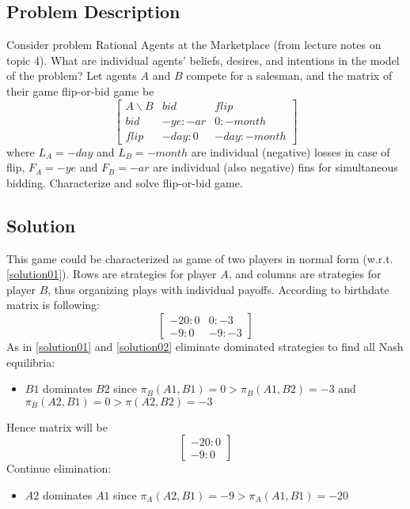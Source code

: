 \documentclass[
	a4paper, %
	11pt, %
]{CSUniSchoolLabReport}
\begin{document}
\subsection{Problem Description}\label{writeup03}
Consider problem Rational Agents at the Marketplace (from lecture notes on topic 4). What are individual agents’ beliefs, desires, and intentions in the model of the problem? Let agents $A$ and $B$ compete for a salesman, and the matrix of their game flip-or-bid game be
$$
\begin{bmatrix}
    A\backslash B & bid & flip \\
    bid & -ye:-ar & 0:-month \\
    flip & -day:0 & -day:-month
\end{bmatrix}
$$
where $L_A = -day$ and $L_B = -month$ are individual (negative) losses in case of flip, $F_A = -ye$ and $F_B = -ar$ are individual (also negative) fins for simultaneous bidding. Characterize and solve flip-or-bid game.

\subsection{Solution}\label{solution03}
This game could be characterized as game of two players in normal form (w.r.t. \ref{solution01}). Rows are strategies for player $A$, and columns are strategies for player $B$, thus organizing plays with individual payoffs. According to birthdate matrix is following:
$$
\begin{bmatrix}
    -20:0 & 0:-3 \\
    -9:0 & -9:-3
\end{bmatrix}
$$
As in \ref{solution01} and \ref{solution02} eliminate dominated strategies to find all Nash equilibria:
\begin{itemize}
    \item $B1$ dominates $B2$ since $\pi_B(A1, B1) = 0 > \pi_B(A1, B2) = -3$ and $\pi_B(A2, B1) = 0 > \pi(A2, B2) = -3$
\end{itemize}\hspace{2pt}

Hence matrix will be
$$
\begin{bmatrix}
    -20:0 \\
    -9:0
\end{bmatrix}
$$
Continue elimination:
\begin{itemize}
    \item $A2$ dominates $A1$ since $\pi_A(A2,B1) = -9 > \pi_A(A1, B1) = -20$
\end{itemize}\hspace{2pt}
\end{document}
